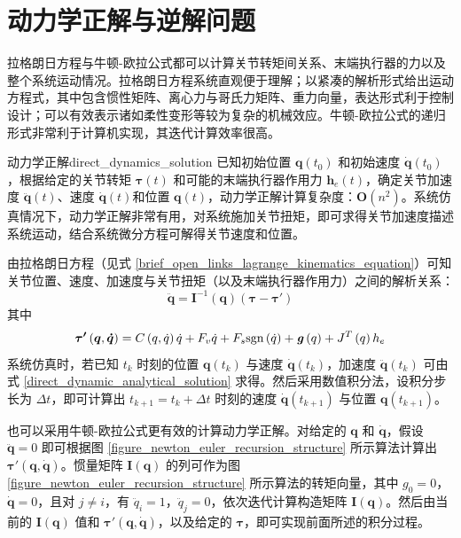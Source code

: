 \documentclass[cn,11pt,chinese,blue,bibstyle=ieeetr]{elegantbook}
\begin{document}
\section{动力学正解与逆解问题}

拉格朗日方程与牛顿-欧拉公式都可以计算关节转矩间关系、末端执行器的力以及整个系统运动情况。拉格朗日方程系统直观便于理解；以紧凑的解析形式给出运动方程式，其中包含惯性矩阵、离心力与哥氏力矩阵、重力向量，表达形式利于控制设计；可以有效表示诸如柔性变形等较为复杂的机械效应。牛顿-欧拉公式的递归形式非常利于计算机实现，其迭代计算效率很高。

\begin{definition}{动力学正解}{direct_dynamics_solution}
已知初始位置 $\bm{q}(t_0)$ 和初始速度 $\bm{\dot{q}}(t_0)$，根据给定的关节转矩 $\bm{\tau}(t)$ 和可能的末端执行器作用力 $\bm{h}_e(t)$，确定关节加速度 $\bm{\ddot{q}}(t)$、速度 $\bm{\dot{q}}(t)$和位置 $\bm{{q}}(t)$，动力学正解计算复杂度：$\bm{O}(n^2)$。系统仿真情况下，动力学正解非常有用，对系统施加关节扭矩，即可求得关节加速度描述系统运动，结合系统微分方程可解得关节速度和位置。
\end{definition}

由拉格朗日方程（见式 \ref{brief_open_links_lagrange_kinematics_equation}）可知关节位置、速度、加速度与关节扭矩（以及末端执行器作用力）之间的解析关系：
\begin{equation}\label{direct_dynamic_analytical_solution}
\bm{\ddot{q}} = \bm{I}^{-1}\left(\bm{q}\right)\left(\bm{\tau}-\bm{\tau'}\right)
\end{equation}
其中
\begin{equation}
\bm{\tau'}\left(\bm{q},\bm{\dot{q}}\right) = C\left(q, \dot{q}\right)\dot{q} + F_v\dot{q} + F_s \text{sgn}\left(\dot{q}\right) + \textbf{\textit{g}}\left(q\right) + J^T\left(q\right)h_e
\end{equation}
系统仿真时，若已知 $t_k$ 时刻的位置 $\bm{q}(t_k)$ 与速度 $\bm{\dot{q}}(t_k)$，加速度 $\bm{\ddot{q}}(t_k)$ 可由式 \ref{direct_dynamic_analytical_solution} 求得。然后采用数值积分法，设积分步长为 $\Delta t$，即可计算出 $t_{k+1}=t_k+\Delta t$ 时刻的速度 $\bm{\dot{q}}(t_{k+1})$ 与位置 $\bm{q}(t_{k+1})$。

也可以采用牛顿-欧拉公式更有效的计算动力学正解。对给定的 $\bm{q}$ 和 $\bm{\dot{q}}$，假设 $\bm{\ddot{q}} = 0$ 即可根据图 \ref{figure_newton_euler_recursion_structure} 所示算法计算出 $\bm{\tau'}\left(\bm{q},\bm{\dot{q}}\right)$。惯量矩阵 $\bm{I}\left(\bm{q}\right)$ 的列可作为图 \ref{figure_newton_euler_recursion_structure} 所示算法的转矩向量，其中 $\textit{g}_0=0$，$\bm{\dot{q}}=0$，且对 $j \neq i$，有 $\ddot{q}_i=1$，$\ddot{q}_j=0$，依次迭代计算构造矩阵 $\bm{I}\left(\bm{q}\right)$。然后由当前的 $\bm{I}\left(\bm{q}\right)$ 值和 $\bm{\tau'}\left(\bm{q},\bm{\dot{q}}\right)$，以及给定的 $\bm{\tau}$，即可实现前面所述的积分过程。
\end{document}
